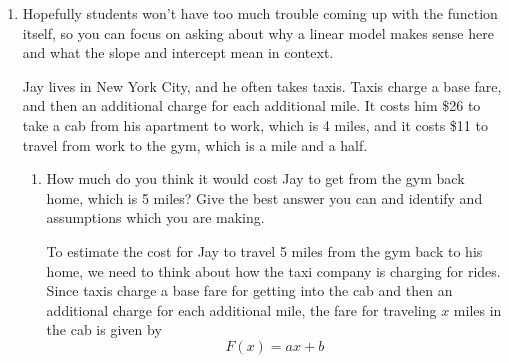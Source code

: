 \documentclass[10pt]{article}
\begin{document}
\begin{enumerate}[leftmargin=*]
\begin{solution}
\begin{itemize}
\item Finally, the parameter \( k \) describes how quickly the coffee cools and depends on various factors like the material of the mug. Assuming that after 15 minutes the coffee cools to $100^\circ \text{F}$, we can solve for \( k \) as follows:

\begin{align*}
f(15) &= 100^\circ \text{F} = 72^\circ \text{F} + 118^\circ \text{F} \cdot e^{-15k} \\
28^\circ \text{F} &= 118^\circ \text{F} \cdot e^{-15k} \\
\frac{28}{118} &= e^{-15k} \\
\ln \left( \frac{28}{118} \right) &= -15k \\
k &= -\frac{1}{15} \ln \left( \frac{28}{118} \right) \approx 0.01 
\end{align*}
\end{itemize}

So a reasonable model for our situation is that $$f(t) = 72 + 118\cdot e^{-.01 t}$$
\end{solution}


\item
    \begin{note}
        Hopefully students won't have too much trouble coming up with the function itself, so you can focus on asking about why a linear model makes sense here and what the slope and intercept mean in context. 
    \end{note}

    Jay lives in New York City, and he often takes taxis. Taxis charge a base fare, and then an additional charge for each additional mile. It costs him \$26 to take a cab from his apartment to work, which is 4 miles, and it costs \$11 to travel from work to the gym, which is a mile and a half. 
    \begin{enumerate}
        \item \label{5mile} 
        \begin{problem}[\vfill]
            How much do you think it would cost Jay to get from the gym back home, which is 5 miles?
            Give the best answer you can and identify and assumptions which you are making.
        \end{problem}
        \begin{solution} 
  
    To estimate the cost for Jay to travel 5 miles from the gym back to his home, we need to think about how the taxi company is charging for rides. Since taxis charge a base fare for getting into the cab and then an additional charge for each additional mile, the fare for traveling \(x\) miles in the cab is given by
    \[
    F(x) = ax + b
    \]
    

\end{solution}
\end{enumerate}
\end{enumerate}
\end{document}
